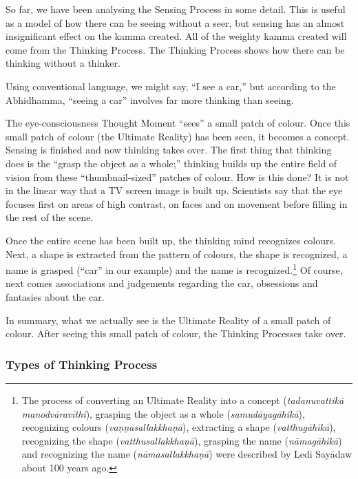So far, we have been analysing the Sensing Process in some detail. This is useful as a model of how there can be seeing without a seer, but sensing has an almost insignificant effect on the kamma created. All of the weighty kamma created will come from the Thinking Process. The Thinking Process shows how there can be thinking without a thinker.

Using conventional language, we might say, “I see a car,” but according to the Abhidhamma, “seeing a car” involves far more thinking than seeing.

The eye-consciousness Thought Moment “sees” a small patch of colour. Once this small patch of colour (the Ultimate Reality) has been seen, it becomes a concept. Sensing is finished and now thinking takes over. The first thing that thinking does is the “grasp the object as a whole;” thinking builds up the entire field of vision from these “thumbnail-sized” patches of colour. How is this done? It is not in the linear way that a TV screen image is built up. Scientists say that the eye focuses first on areas of high contrast, on faces and on movement before filling in the rest of the scene.

Once the entire scene has been built up, the thinking mind recognizes colours. Next, a shape is extracted from the pattern of colours, the shape is recognized, a name is grasped (“car” in our example) and the name is recognized.\footnote{The process of converting an Ultimate Reality into a concept (\textit{tadanuvattikā manodvāravīthi}), grasping the object as a whole (\textit{samudāyagāhikā}), recognizing colours (\textit{vaṇṇasallakkhaṇā}), extracting a shape (\textit{vatthugāhikā}), recognizing the shape (\textit{vatthusallakkhaṇā}), grasping the name (\textit{nāmagāhikā}) and recognizing the name (\textit{nāmasallakkhaṇā}) were described by Ledi Sayādaw about 100 years ago.} Of course, next comes associations and judgements regarding the car, obsessions and fantasies about the car.

In summary, what we actually see is the Ultimate Reality of a small patch of colour. After seeing this small patch of colour, the Thinking Processes take over.

\subsubsection*{Types of Thinking Process}

